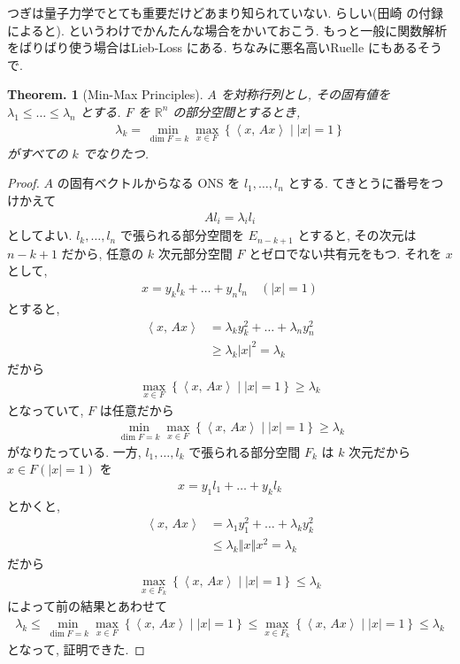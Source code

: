\documentclass[openany, a4paper, oneside]{jsbook}
\theoremstyle{break}
\newtheorem{thm}{Theorem.}[section]
\theoremstyle{breakdefn}
\newcommand{\abs}[1]{\left|#1\right|}
\newcommand{\norm}[1]{\left\Vert#1\right\Vert}
\newcommand{\bkt}[2]{\left\langle#1,\,#2\right\rangle}
\newcommand{\relmiddle}[1]{\mathrel{}\middle#1\mathrel{}}
\newcommand{\set}[2]{\left\{#1 \relmiddle| #2\right\}}
\begin{document}
つぎは量子力学でとても重要だけどあまり知られていない.
らしい(田崎 \cite{HalTasaki3}の付録によると).
というわけでかんたんな場合をかいておこう.
もっと一般に関数解析をばりばり使う場合はLieb-Loss \cite{LiebLoss1}にある.
ちなみに悪名高いRuelle \cite{DavidRuelle1}にもあるそうで.
\begin{thm}[Min-Max Principles]
 $A$ を対称行列とし, その固有値を $\lambda_1 \le \dots \le \lambda_n$
 とする.
 $F$ を $\mathbb{R}^n$ の部分空間とするとき,
 \begin{align}
  \lambda_k
  =
  \min_{\dim F=k} \max_{x \in F} \set{\bkt{x}{Ax}}{\abs{x} = 1}
 \end{align}
 がすべての $k$ でなりたつ.
\end{thm}
\begin{proof}
$A$ の固有ベクトルからなる ONS を $l_1, \dots , l_n$ とする.
てきとうに番号をつけかえて
\begin{align}
 Al_i
 =
 \lambda_i l_i
\end{align}
としてよい.
$l_k, \dots , l_n$ で張られる部分空間を $E_{n-k+1}$ とすると,
その次元は $n-k+1$ だから, 任意の $k$ 次元部分空間 $F$ とゼロでない共有元をもつ.
それを $x$ として,
\begin{align}
 x
 =
 y_k l_k + \dots + y_n l_n \quad (\abs{x} = 1)
\end{align}
とすると,
\begin{align}
 \bkt{x}{Ax}
 &=
 \lambda_k y_k^2 + \dots + \lambda_n y_n^2 \\
 &\ge
 \lambda_k |x|^2
 =
 \lambda_k
\end{align}
だから
\begin{align}
 \max_{x\in F } \set{\bkt{x}{Ax}}{\abs{x} = 1}
 \ge
 \lambda_k
\end{align}
となっていて, $F$ は任意だから
\begin{align}
 \min_{\dim F=k} \max_{x\in F} \set{\bkt{x}{Ax}}{\abs{x} = 1}
 \ge
 \lambda_k
\end{align}
がなりたっている.
一方, $l_1, \dots , l_k$ で張られる部分空間 $F_k$ は $k$ 次元だから $x \in F (\abs{x} = 1)$ を
\begin{align}
 x
 =
 y_1 l_1 + \dots + y_k l_k
\end{align}
とかくと,
\begin{align}
 \bkt{x}{Ax}
 &=
 \lambda_1 y_1^2 + \dots + \lambda_k y_k^2  \\
 &\le
 \lambda_k \norm{x}x^2
 =
 \lambda_k
\end{align}
だから
\begin{align}
 \max_{x \in F_k} \set{\bkt{x}{Ax}}{\abs{x} = 1}
 \le
 \lambda_k
\end{align}
によって前の結果とあわせて
\begin{align}
 \lambda_k
 \le
 \min_{\dim F=k} \max_{x \in F} \set{\bkt{x}{Ax}}{\abs{x} = 1}
 \le
 \max_{x \in F_k } \set{\bkt{x}{Ax}}{\abs{x} = 1}
 \le
 \lambda_k
\end{align}
となって, 証明できた.
\end{proof}
\end{document}

